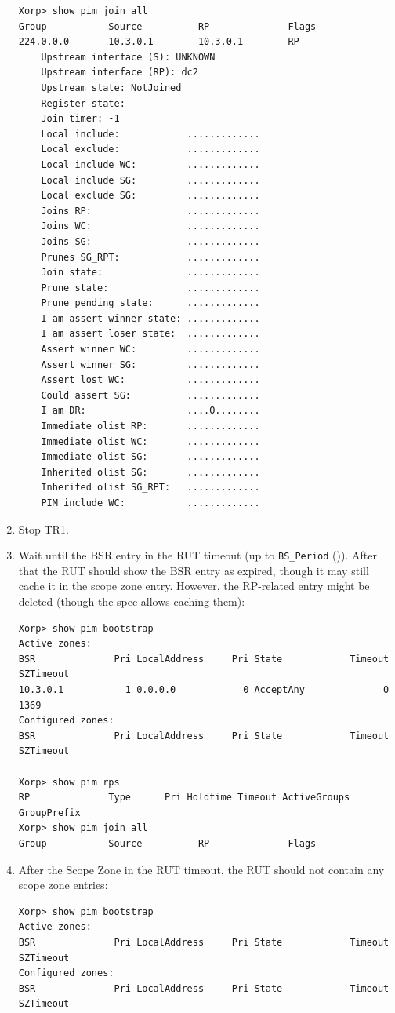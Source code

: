 \documentclass[11pt]{report}
\begin{document}
\begin{enumerate}
\begin{verbatim}
Xorp> show pim join all
Group           Source          RP              Flags
224.0.0.0       10.3.0.1        10.3.0.1        RP
    Upstream interface (S): UNKNOWN
    Upstream interface (RP): dc2
    Upstream state: NotJoined
    Register state:
    Join timer: -1
    Local include:            .............
    Local exclude:            .............
    Local include WC:         .............
    Local include SG:         .............
    Local exclude SG:         .............
    Joins RP:                 .............
    Joins WC:                 .............
    Joins SG:                 .............
    Prunes SG_RPT:            .............
    Join state:               .............
    Prune state:              .............
    Prune pending state:      .............
    I am assert winner state: .............
    I am assert loser state:  .............
    Assert winner WC:         .............
    Assert winner SG:         .............
    Assert lost WC:           .............
    Could assert SG:          .............
    I am DR:                  ....O........
    Immediate olist RP:       .............
    Immediate olist WC:       .............
    Immediate olist SG:       .............
    Inherited olist SG:       .............
    Inherited olist SG_RPT:   .............
    PIM include WC:           .............
\end{verbatim}

  \item Stop TR1.

  \item Wait until the BSR entry in the RUT timeout (up to \verb=BS_Period=
        ({\PimsmBSPeriod})). After that the RUT should show the BSR entry as
        expired, though it may still cache it in the scope zone entry.
        However, the RP-related entry might be deleted (though the spec
        allows caching them):

\begin{verbatim}
Xorp> show pim bootstrap
Active zones:
BSR              Pri LocalAddress     Pri State            Timeout SZTimeout
10.3.0.1           1 0.0.0.0            0 AcceptAny              0      1369
Configured zones:
BSR              Pri LocalAddress     Pri State            Timeout SZTimeout

Xorp> show pim rps
RP              Type      Pri Holdtime Timeout ActiveGroups GroupPrefix
Xorp> show pim join all
Group           Source          RP              Flags
\end{verbatim}

  \item After the Scope Zone in the RUT timeout, the RUT should not contain any
        scope zone entries:

\begin{verbatim}
Xorp> show pim bootstrap
Active zones:
BSR              Pri LocalAddress     Pri State            Timeout SZTimeout
Configured zones:
BSR              Pri LocalAddress     Pri State            Timeout SZTimeout
\end{verbatim}

\end{enumerate}
\end{document}
